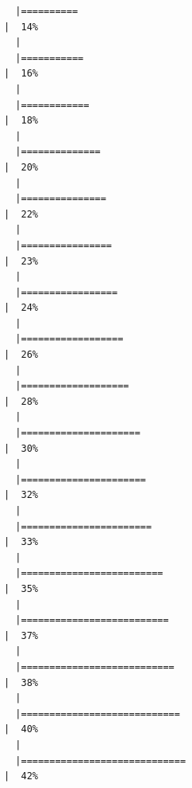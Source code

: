 \documentclass[
  letterpaper,
  DIV=11,
  numbers=noendperiod]{scrreprt}
\begin{document}
\begin{verbatim}
  |==========                                                            |  14%
  |                                                                            
  |===========                                                           |  16%
  |                                                                            
  |============                                                          |  18%
  |                                                                            
  |==============                                                        |  20%
  |                                                                            
  |===============                                                       |  22%
  |                                                                            
  |================                                                      |  23%
  |                                                                            
  |=================                                                     |  24%
  |                                                                            
  |==================                                                    |  26%
  |                                                                            
  |===================                                                   |  28%
  |                                                                            
  |=====================                                                 |  30%
  |                                                                            
  |======================                                                |  32%
  |                                                                            
  |=======================                                               |  33%
  |                                                                            
  |=========================                                             |  35%
  |                                                                            
  |==========================                                            |  37%
  |                                                                            
  |===========================                                           |  38%
  |                                                                            
  |============================                                          |  40%
  |                                                                            
  |=============================                                         |  42%

\end{verbatim}
\end{document}
